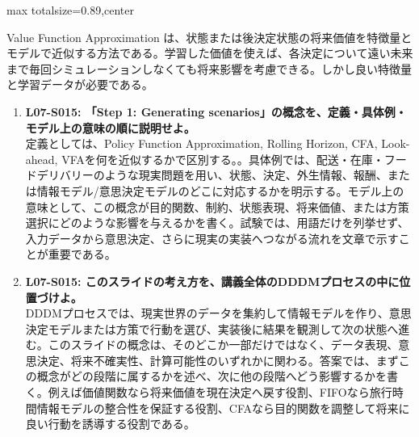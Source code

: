 \begin{minipage}[t]{0.58\textwidth}
\begin{adjustbox}{max totalsize={\textwidth}{0.89\textheight},center}
\begin{minipage}{\textwidth}
Value Function Approximation は、状態または後決定状態の将来価値を特徴量とモデルで近似する方法である。学習した価値を使えば、各決定について遠い未来まで毎回シミュレーションしなくても将来影響を考慮できる。しかし良い特徴量と学習データが必要である。\par{}\begin{enumerate}\item \textbf{L07-S015: 「Step 1: Generating scenarios」の概念を、定義・具体例・モデル上の意味の順に説明せよ。}\\定義としては、Policy Function Approximation, Rolling Horizon, CFA, Look-ahead, VFAを何を近似するかで区別する。。具体例では、配送・在庫・フードデリバリーのような現実問題を用い、状態、決定、外生情報、報酬、または情報モデル/意思決定モデルのどこに対応するかを明示する。モデル上の意味として、この概念が目的関数、制約、状態表現、将来価値、または方策選択にどのような影響を与えるかを書く。試験では、用語だけを列挙せず、入力データから意思決定、さらに現実の実装へつながる流れを文章で示すことが重要である。\item \textbf{L07-S015: このスライドの考え方を、講義全体のDDDMプロセスの中に位置づけよ。}\\DDDMプロセスでは、現実世界のデータを集約して情報モデルを作り、意思決定モデルまたは方策で行動を選び、実装後に結果を観測して次の状態へ進む。このスライドの概念は、そのどこか一部だけではなく、データ表現、意思決定、将来不確実性、計算可能性のいずれかに関わる。答案では、まずこの概念がどの段階に属するかを述べ、次に他の段階へどう影響するかを書く。例えば価値関数なら将来価値を現在決定へ戻す役割、FIFOなら旅行時間情報モデルの整合性を保証する役割、CFAなら目的関数を調整して将来に良い行動を誘導する役割である。\end{enumerate}
\end{minipage}
\end{adjustbox}
\end{minipage}


